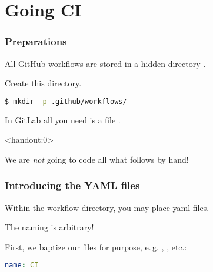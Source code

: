 \section{Going CI}
{   
}

\begin{frame}[fragile]
   \frametitle{Preparations}
	All GitHub workflows are stored in a hidden directory .
	\begin{task}
		{Create this directory.}
	\end{task}
    \begin{lstlisting}[language=Bash, style=Shell]
$ mkdir -p .github/workflows/
    \end{lstlisting}
    \pause
    \begin{docs}
    	{In GitLab all you need is a file .}
    \end{docs}
\end{frame}

\begin{frame}<handout:0>
	\begin{hint}
		{We are \emph{not} going to code all what follows by hand!}
	\end{hint}
\end{frame}

\begin{frame}[fragile]
	\frametitle{Introducing the YAML files}
	Within the workflow directory, you may place yaml files.
	\begin{docs}
		{The naming is arbitrary!}
	\end{docs}
    First, we baptize our files for purpose, e.\,g. , , etc.:
    \begin{lstlisting}[language=yaml,basicstyle=\small\ttfamily]
name: CI
    \end{lstlisting}
\end{frame}

